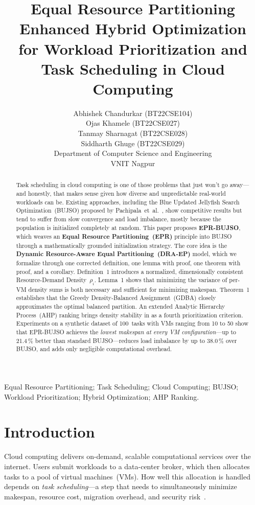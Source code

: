 \documentclass[journal]{IEEEtran}
\title{\textbf{Equal Resource Partitioning Enhanced Hybrid Optimization\\
for Workload Prioritization and Task Scheduling in Cloud Computing}}
\author{
  Abhishek Chandurkar (BT22CSE104)\\[2pt]
  Ojas Khamele (BT22CSE027)\\[2pt]
  Tanmay Sharnagat (BT22CSE028)\\[2pt]
  Siddharth Ghuge (BT22CSE029)\\[2pt]
  Department of Computer Science and Engineering\\
  VNIT Nagpur\\
  
}
\begin{document}
\maketitle

\setlength{\parskip}{8pt}

\begin{abstract}
Task scheduling in cloud computing is one of those problems that just won't go away---and honestly, that makes sense given how diverse and unpredictable real-world workloads can be. Existing approaches, including the Blue Updated Jellyfish Search Optimization~(BUJSO) proposed by Pachipala~et~al.~\cite{pachipala2024}, show competitive results but tend to suffer from slow convergence and load imbalance, mostly because the population is initialized completely at random. This paper proposes \textbf{EPR-BUJSO}, which weaves an \textbf{Equal Resource Partitioning~(EPR)} principle into BUJSO through a mathematically grounded initialization strategy. The core idea is the \textbf{Dynamic Resource-Aware Equal Partitioning~(DRA-EP)} model, which we formalize through one corrected definition, one lemma with proof, one theorem with proof, and a corollary. Definition~1 introduces a normalized, dimensionally consistent Resource-Demand Density~$\rho_i$. Lemma~1 shows that minimizing the variance of per-VM density sums is both necessary and sufficient for minimizing makespan. Theorem~1 establishes that the Greedy Density-Balanced Assignment~(GDBA) closely approximates the optimal balanced partition. An extended Analytic Hierarchy Process~(AHP) ranking brings density stability in as a fourth prioritization criterion. Experiments on a synthetic dataset of 100~tasks with VMs ranging from 10 to 50 show that EPR-BUJSO achieves the \emph{lowest makespan at every VM configuration}---up to 21.4\,\% better than standard BUJSO---reduces load imbalance by up to 38.0\,\% over BUJSO, and adds only negligible computational overhead.
\end{abstract}

\begin{IEEEkeywords}
Equal Resource Partitioning; Task Scheduling; Cloud Computing;
BUJSO; Workload Prioritization; Hybrid Optimization; AHP Ranking.
\end{IEEEkeywords}
\section{Introduction}
\label{sec:introduction}

Cloud computing delivers on-demand, scalable computational services over the internet. Users submit workloads to a data-center broker, which then allocates tasks to a pool of virtual machines~(VMs). How well this allocation is handled depends on \emph{task scheduling}---a step that needs to simultaneously minimize makespan, resource cost, migration overhead, and security risk~\cite{pachipala2024,alsadie2021}.
\end{document}
